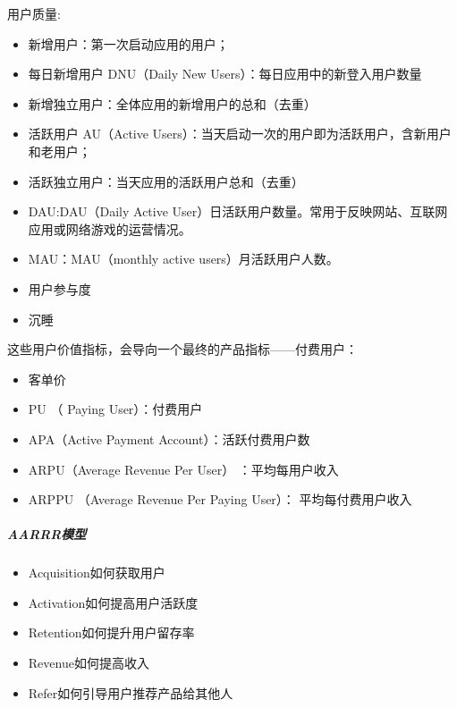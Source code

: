 \documentclass[letterpaper,11pt,english]{sphinxmanual}
\begin{document}
用户质量:
\begin{itemize}
\item {} 
新增用户：第一次启动应用的用户；

\item {} 
每日新增用户 DNU（Daily New Users）：每日应用中的新登入用户数量

\item {} 
新增独立用户：全体应用的新增用户的总和（去重）

\item {} 
活跃用户 AU（Active
Users）：当天启动一次的用户即为活跃用户，含新用户和老用户；

\item {} 
活跃独立用户：当天应用的活跃用户总和（去重）

\item {} 
DAU:DAU（Daily Active
User）日活跃用户数量。常用于反映网站、互联网应用或网络游戏的运营情况。

\item {} 
MAU：MAU（monthly active users）月活跃用户人数。

\item {} 
用户参与度

\item {} 
沉睡

\end{itemize}

这些用户价值指标，会导向一个最终的产品指标——付费用户：
\begin{itemize}
\item {} 
客单价

\item {} 
PU （ Paying User）：付费用户

\item {} 
APA（Active Payment Account）：活跃付费用户数

\item {} 
ARPU（Average Revenue Per User） ：平均每用户收入

\item {} 
ARPPU （Average Revenue Per Paying User）： 平均每付费用户收入

\end{itemize}


\subparagraph{AARRR模型}
\label{\detokenize{chapter_knowledge/data_analysis:aarrr}}\begin{itemize}
\item {} 
Acquisition\sphinxhyphen{}如何获取用户

\item {} 
Activation\sphinxhyphen{}如何提高用户活跃度

\item {} 
Retention\sphinxhyphen{}如何提升用户留存率

\item {} 
Revenue\sphinxhyphen{}如何提高收入

\item {} 
Refer\sphinxhyphen{}如何引导用户推荐产品给其他人

\end{itemize}
\end{document}

